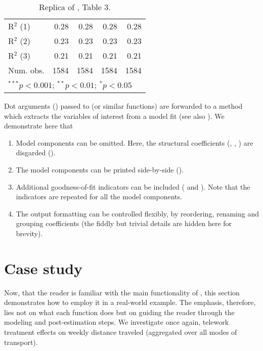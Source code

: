 \documentclass[%
    twoside, openright, titlepage, numbers=noenddot,%
    cleardoublepage=empty,%
    abstract=false,%
    BCOR=5.5mm, paper=a5, fontsize=10pt,%
]{scrreprt}
\begin{document}
\begin{Schunk}
\begin{table}[t!]
\begin{center}
{\begin{tabular}{l D{)}{)}{9)3} D{)}{)}{9)3} D{)}{)}{9)3} D{)}{)}{9)3}}
R$^2$ (1)                                  & 0.28                 & 0.28                 & 0.28                 & 0.28                  \\
R$^2$ (2)                                  & 0.23                 & 0.23                 & 0.23                 & 0.23                  \\
R$^2$ (3)                                  & 0.21                 & 0.21                 & 0.21                 & 0.21                  \\
Num. obs.                                  & 1584                 & 1584                 & 1584                 & 1584                  \\
\bottomrule
{}
\end{tabular}
}
\caption{Replica of \cite{Wang+Mokhtarian:2024}, Table 3.}
\label{tab:wang-replica}
\end{center}
\end{table}\end{Schunk}
%
Dot arguments () passed to  (or similar functions) are forwarded to a  method  which extracts the variables of interest from a model fit (see also ). We demonstrate here that
\begin{enumerate}
\item Model components can be omitted. Here, the structural coefficients (, , ) are disgarded ().
\item The model components can be printed side-by-side ().
\item Additional goodness-of-fit indicators can be included ( and ). Note that the indicators are repeated for all the model components.
\item The output formatting can be controlled flexibly, by reordering, renaming and grouping coefficients (the fiddly but trivial details are hidden here for brevity).
\end{enumerate}


\section{Case study} \label{sec:case-study}

Now, that the reader is familiar with the main functionality of , this section demonstrates how to employ it in a real-world example. The emphasis, therefore, lies not on what each function does but on guiding the reader through the modeling and post-estimation steps. We investigate once again, telework treatment effects on weekly distance traveled (aggregated over all modes of transport).
\end{document}
